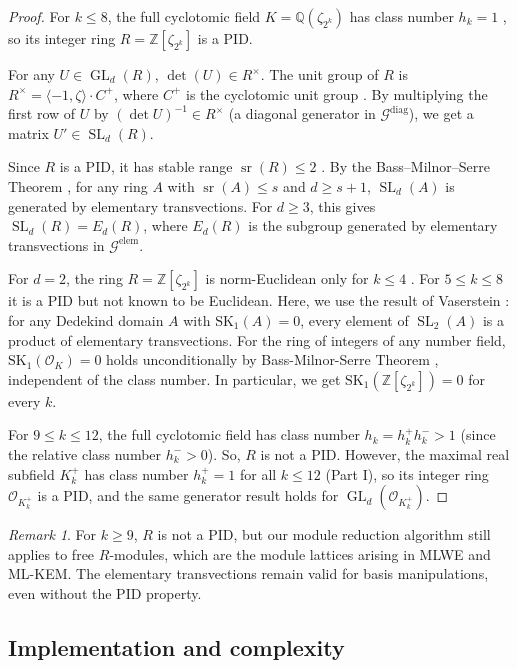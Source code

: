 \documentclass[11pt,a4paper]{article}
\theoremstyle{plain}
\theoremstyle{definition}
\theoremstyle{remark}
\newtheorem{remark}[theorem]{Remark}
\DeclareMathOperator{\GL}{GL}
\DeclareMathOperator{\SL}{SL}
\DeclareMathOperator{\sr}{sr}
\newcommand{\Z}{\mathbb{Z}}
\newcommand{\Q}{\mathbb{Q}}
\newcommand{\cO}{\mathcal{O}}
\begin{document}
\begin{proof}
For $k\le 8$, the full cyclotomic field $K=\Q(\zeta_{2^k})$ has class number $h_k=1$ \cite{Wash97}, so its integer ring $R=\Z[\zeta_{2^k}]$ is a PID.

For any $U\in\GL_d(R)$, $\det(U)\in R^\times$. The unit group of $R$ is $R^\times=\langle-1, \zeta \rangle \cdot C^+$, where $C^+$ is the cyclotomic unit group \cite{Sinnott78}. By multiplying the first row of $U$ by $(\det U)^{-1}\in R^\times$ (a diagonal generator in $\mathcal{G}^{\text{diag}}$), we get a matrix $U'\in\SL_d(R)$.

Since $R$ is a PID, it has stable range $\sr(R)\le2$ \cite[Theorem V.3.5]{HOM89}. By the Bass–Milnor–Serre Theorem \cite{BMS67}, for any ring $A$ with $\sr(A)\le s$ and $d\ge s+1$, $\SL_d(A)$ is generated by elementary transvections. For $d\ge3$, this gives $\SL_d(R)=E_d(R)$, where $E_d(R)$ is the subgroup generated by elementary transvections in $\mathcal{G}^{\text{elem}}$.

For $d=2$, the ring $R=\Z[\zeta_{2^k}]$ is norm-Euclidean only for $k\le 4$ \cite{Lenstra79,Lemmermeyer95}. For $5\le k\le 8$ it is a PID but not known to be Euclidean. Here, we use the result of Vaserstein \cite{Vaserstein72}: for any Dedekind domain $A$ with $\mathrm{SK}_1(A)=0$, every element of $\SL_2(A)$ is a product of elementary transvections. For the ring of integers of any number field, $\mathrm{SK}_1(\cO_K)=0$ holds unconditionally by Bass-Milnor-Serre Theorem \cite{BMS67}, independent of the class number. In particular, we get $\mathrm{SK}_1(\Z[\zeta_{2^k}])=0$ for every $k$.

For $9\le k\le12$, the full cyclotomic field has class number $h_k=h_k^+h_k^->1$ (since the relative class number $h_k^->0$). So, $R$ is not a PID. However, the maximal real subfield $K_k^+$ has class number $h_k^+=1$ for all $k\le 12$ (Part I), so its integer ring $\cO_{K_k^+}$ is a PID, and the same generator result holds for $\GL_d(\cO_{K_k^+})$.
\end{proof}

\begin{remark}\label{rem:euclidean}
For $k\ge 9$, $R$ is not a PID, but our module reduction algorithm still applies to free $R$-modules, which are the module lattices arising in MLWE and ML-KEM. The elementary transvections remain valid for basis manipulations, even without the PID property.
\end{remark}

\subsection{Implementation and complexity}\label{subsec:impl}
\end{document}
